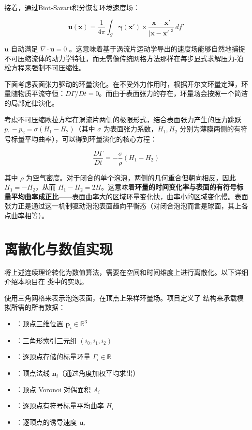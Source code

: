 接着，通过Biot-Savart积分恢复环境速度场：

\begin{equation}
\mathbf{u}(\mathbf{x}) = \frac{1}{4\pi} \int_S \boldsymbol{\gamma}(\mathbf{x}') \times \frac{\mathbf{x} - \mathbf{x}'}{|\mathbf{x} - \mathbf{x}'|^3} \, df'
\label{eq:biot_savart}
\end{equation}

$\mathbf{u}$ 自动满足 $\nabla \cdot \mathbf{u} = 0$ 。这意味着基于涡流片运动学导出的速度场能够自然地捕捉不可压缩流体的动力学特征，而无需像传统网格方法那样在每步显式求解压力-泊松方程来强制不可压缩性。

下面考虑表面张力驱动的环量演化。在不受外力作用时，根据开尔文环量定理，环量随物质平流守恒：$D\Gamma/Dt = 0$。而由于表面张力的存在，环量场会按照一个简洁的局部定律演化。

考虑不可压缩欧拉方程在涡流片两侧的极限形式，结合表面张力产生的压力跳跃 $p_1 - p_2 = \sigma(H_1 - H_2)$（其中 $\sigma$ 为表面张力系数，$H_1, H_2$ 分别为薄膜两侧的有符号标量平均曲率），可以得到环量演化的核心方程：

\begin{equation}
\frac{D\Gamma}{Dt} = -\frac{\sigma}{\rho} (H_1 - H_2)
\label{eq:circulation_evolution}
\end{equation}

其中 $\rho$ 为空气密度。对于闭合的单个泡泡，两侧的几何重合但朝向相反，因此 $H_1 = -H_2$，从而 $H_1 - H_2 = 2H$。这意味着\textbf{环量的时间变化率与表面的有符号标量平均曲率成正比}——表面曲率大的区域环量变化快，曲率小的区域变化慢。表面张力正是通过这一机制驱动泡泡表面趋向平衡态（对闭合泡泡而言是球面，其上各点曲率相等）。

\section{离散化与数值实现}

将上述连续理论转化为数值算法，需要在空间和时间维度上进行离散化。以下详细介绍本项目在  类中的实现。

使用三角网格来表示泡泡表面，在顶点上采样环量场。项目定义了  结构来承载模拟所需的所有数据：

\begin{itemize}
  \item {}：顶点三维位置 $\mathbf{p}_i \in \mathbb{R}^3$
  \item {}：三角形索引三元组 $(i_0, i_1, i_2)$
  \item {}：逐顶点存储的标量环量 $\Gamma_i \in \mathbb{R}$
  \item {}：顶点法线 $\mathbf{n}_i$（通过角度加权平均求出）
  \item {}：顶点 Voronoi 对偶面积 $A_i$
  \item {}：逐顶点有符号标量平均曲率 $H_i$
  \item {}：逐顶点的诱导速度 $\mathbf{u}_i$
\end{itemize}

